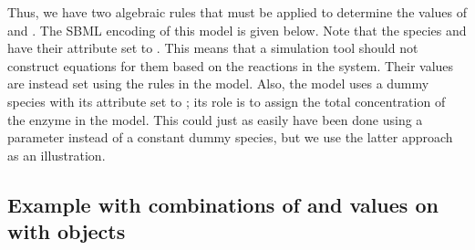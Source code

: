 Thus, we have two algebraic rules that must be applied to
determine the values of  and .  The SBML
encoding of this model is given below.  Note that the species
 and  have their 
attribute set to .  This means that a simulation tool
should not construct equations for them based on the reactions in
the system.  Their values are instead set using the rules in the
model.  Also, the model uses a dummy species
 with its  attribute set to
; its role is to assign the total concentration of the
enzyme in the model.  This could just as easily have been done
using a parameter instead of a constant dummy species, but we use
the latter approach as an illustration.



\subsection{Example with combinations of
   and  values on 
  with  objects}
\label{sec:constantspecieseg}

